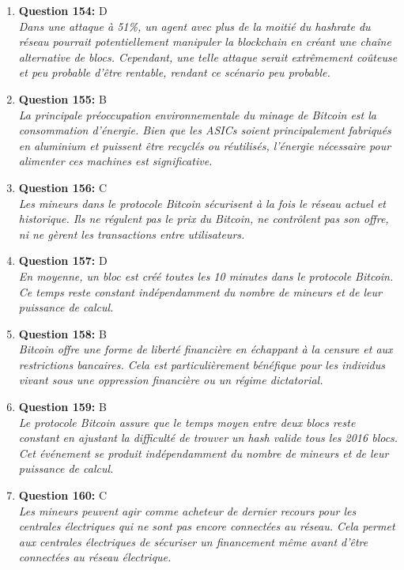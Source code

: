 \documentclass[12pt,a4paper]{article}
\begin{document}
\begin{enumerate}
\item \textbf{Question 154:} D
\\ \textit{Dans une attaque à 51\%, un agent avec plus de la moitié du hashrate du réseau pourrait potentiellement manipuler la blockchain en créant une chaîne alternative de blocs. Cependant, une telle attaque serait extrêmement coûteuse et peu probable d'être rentable, rendant ce scénario peu probable.}

\item \textbf{Question 155:} B
\\ \textit{La principale préoccupation environnementale du minage de Bitcoin est la consommation d'énergie. Bien que les ASICs soient principalement fabriqués en aluminium et puissent être recyclés ou réutilisés, l'énergie nécessaire pour alimenter ces machines est significative.}

\item \textbf{Question 156:} C
\\ \textit{Les mineurs dans le protocole Bitcoin sécurisent à la fois le réseau actuel et historique. Ils ne régulent pas le prix du Bitcoin, ne contrôlent pas son offre, ni ne gèrent les transactions entre utilisateurs.}

\item \textbf{Question 157:} D
\\ \textit{En moyenne, un bloc est créé toutes les 10 minutes dans le protocole Bitcoin. Ce temps reste constant indépendamment du nombre de mineurs et de leur puissance de calcul.}

\item \textbf{Question 158:} B
\\ \textit{Bitcoin offre une forme de liberté financière en échappant à la censure et aux restrictions bancaires. Cela est particulièrement bénéfique pour les individus vivant sous une oppression financière ou un régime dictatorial.}

\item \textbf{Question 159:} B
\\ \textit{Le protocole Bitcoin assure que le temps moyen entre deux blocs reste constant en ajustant la difficulté de trouver un hash valide tous les 2016 blocs. Cet événement se produit indépendamment du nombre de mineurs et de leur puissance de calcul.}

\item \textbf{Question 160:} C
\\ \textit{Les mineurs peuvent agir comme acheteur de dernier recours pour les centrales électriques qui ne sont pas encore connectées au réseau. Cela permet aux centrales électriques de sécuriser un financement même avant d'être connectées au réseau électrique.}


\end{enumerate}
\end{document}
